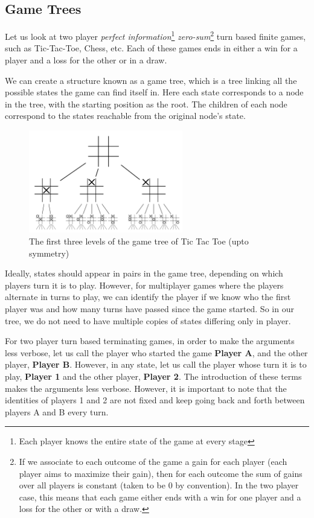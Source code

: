 \documentclass[12pt]{report}
\begin{document}
\subsection{Game Trees}

Let us look at two player \textit{perfect information}\footnote{Each player knows the entire state of the game at every stage} \textit{zero-sum}\footnote{If we associate to each outcome of the game a gain for each player (each player aims to maximize their gain), then for each outcome the sum of gains over all players is constant (taken to be $0$ by convention). In the two player case, this means that each game either ends with a win for one player and a loss for the other or with a draw.} turn based finite games, such as Tic-Tac-Toe, Chess, etc. Each of these games ends in either a win for a player and a loss for the other or in a draw.

We can create a structure known as a game tree, which is a tree linking all the possible states the game can find itself in.
Here each state corresponds to a node in the tree, with the starting position as the root. The children of each node correspond to the states reachable from the original node's state.
\begin{figure}[H]
    \centering
    \includegraphics[width=0.6\textwidth]{images/tic_tac_toe_game_tree.png}
    \caption{The first three levels of the game tree of Tic Tac Toe (upto symmetry)}
\end{figure}

Ideally, states should appear in pairs in the game tree, depending on which players turn it is to play. However, for multiplayer games where the players alternate in turns to play, we
can identify the player if we know who the first player was and how many turns have passed since the game started. So in our tree, we do not need to have multiple copies of states differing only in player.

For two player turn based terminating games, in order to make the arguments less verbose, let us call the player who started the game \textbf{Player A}, and the other player, \textbf{Player B}.
However, in any state, let us call the player whose turn it is to play, \textbf{Player 1} and the other player, \textbf{Player 2}. The introduction of these terms makes the arguments less verbose.
However, it is important to note that the identities of players 1 and 2 are not fixed and keep going back and forth between players A and B every turn.
\end{document}
